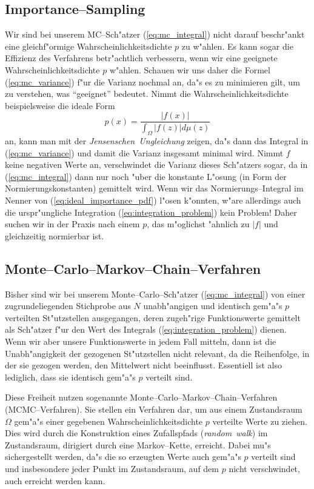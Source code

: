 	\subsection{Importance--Sampling}
	Wir sind bei unserem MC--Sch"atzer (\ref{eq:mc_integral}) nicht darauf beschr"ankt eine gleich\-f"or\-mi\-ge Wahrscheinlichkeitsdichte $p$ zu w"ahlen. Es kann sogar die Effizienz des Verfahrens betr"achtlich verbessern, wenn wir eine geeignete Wahrscheinlichkeitsdichte $p$ w"ahlen. Schauen wir uns daher die Formel (\ref{eq:mc_variance}) f"ur die Varianz nochmal an, da"s es zu minimieren gilt, um zu verstehen, was ``geeignet'' bedeutet. Nimmt die Wahrscheinlichkeitsdichte beispielsweise die ideale Form
	\begin{equation}
		p(x)=\frac{|f(x)|}{\int_\Omega |f(z)|d\mu(z)}
		\label{eq:ideal_importance_pdf}
	\end{equation}
	an, kann man mit der {\em Jensenschen~Ungleichung} zeigen, da"s dann das Integral in (\ref{eq:mc_variance}) und damit die Varianz insgesamt minimal wird. Nimmt $f$ keine negativen Werte an, verschwindet die Varianz dieses Sch"atzers sogar, da in (\ref{eq:mc_integral}) dann nur noch "uber die konstante L"osung (in Form der Normierungskonstanten) gemittelt wird. Wenn wir das Normierungs--Integral im Nenner von (\ref{eq:ideal_importance_pdf}) l"osen k"onnten, w"are allerdings auch die urspr"ungliche Integration (\ref{eq:integration_problem}) kein Problem! Daher suchen wir in der Praxis nach einem $p$, das m"oglichst "ahnlich zu $|f|$ und gleichzeitig normierbar ist.
	
	
	\subsection{Monte--Carlo--Markov--Chain--Verfahren}
	Bisher sind wir bei unserem Monte--Carlo--Sch"atzer (\ref{eq:mc_integral}) von einer zugrundeliegenden Stichprobe aus $N$ unabh"angigen und identisch gem"a"s $p$ verteilten St"utzstellen ausgegangen, deren zugeh"rige Funktionswerte gemittelt als Sch"atzer f"ur den Wert des Integrals (\ref{eq:integration_problem}) dienen. Wenn wir aber unsere Funktionswerte in jedem Fall mitteln, dann ist die Unabh"angigkeit der gezogenen St"utzstellen nicht relevant, da die Reihenfolge, in der sie gezogen werden, den Mittelwert nicht beeinflusst. Essentiell ist also lediglich, dass sie identisch gem"a"s $p$ verteilt sind.
	
	Diese Freiheit nutzen sogenannte Monte--Carlo--Markov--Chain--Verfahren (MCMC--Verfahren). Sie stellen ein Verfahren dar, um aus einem Zustandsraum $\Omega$ gem"a"s einer gegebenen Wahrscheinlichkeitsdichte $p$ verteilte Werte zu ziehen. Dies wird durch die Konstruktion eines Zufallspfads ({\em random~walk}) im Zustandsraum, dirigiert durch eine Markov--Kette, erreicht. Dabei mu"s sichergestellt werden, da"s die so erzeugten Werte auch gem"a"s $p$ verteilt sind und insbesondere jeder Punkt im Zustandsraum, auf dem $p$ nicht verschwindet, auch erreicht werden kann.
	

